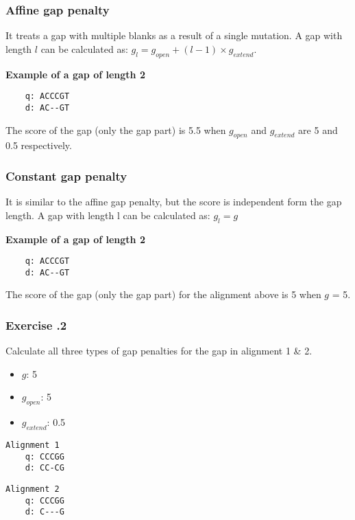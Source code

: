 %
%
\subsubsection*{Affine gap penalty}
It treats a gap with multiple blanks as a result of a single mutation. A gap with length $l$ can be calculated as: $g_l = g_{open} + (l - 1) \times g_{extend}$.
\medskip 

\noindent
\textbf{Example of a gap of length 2}
\begin{verbatim}
    q: ACCCGT
    d: AC--GT
\end{verbatim}
The score of the gap (only the gap part) is 5.5 when $g_{open}$ and $g_{extend}$ are 5 and 0.5 respectively. 

%
%
\subsubsection*{Constant gap penalty}
It is similar to the affine gap penalty, but the score is independent form the gap length. A gap with length l can be calculated as: $g_l = g$ 
\medskip 

\noindent
\textbf{Example of a gap of length 2}
\begin{verbatim}
    q: ACCCGT
    d: AC--GT
\end{verbatim}
The score of the gap (only the gap part) for the alignment above is 5 when $g$ = 5. 

%
%
\subsubsection*{Exercise \thesection.2}
Calculate all three types of gap penalties for the gap in alignment 1 \& 2.

\begin{itemize}
\item $g$: 5
\item $g_{open}$: 5
\item $g_{extend}$: 0.5
\end{itemize}

\begin{multicols}{2}
\begin{verbatim}
Alignment 1
    q: CCCGG 
    d: CC-CG
\end{verbatim}

\begin{verbatim}
Alignment 2 
    q: CCCGG
    d: C---G
\end{verbatim}
\end{multicols}

\bigskip 

%
